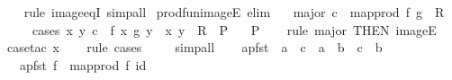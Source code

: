 \begin{isabellebody}
%
\isadelimproof
\ \ %
\endisadelimproof
%
\isatagproof
{}\isamarkupfalse%
\ {\isacharparenleft}{\kern0pt}rule\ image{\isacharunderscore}{\kern0pt}eqI{\isacharparenright}{\kern0pt}\ simp{\isacharunderscore}{\kern0pt}all%
\endisatagproof
{\isafoldproof}%
%
\isadelimproof
\isanewline
%
\endisadelimproof
\isanewline
{}\isamarkupfalse%
\ prod{\isacharunderscore}{\kern0pt}fun{\isacharunderscore}{\kern0pt}imageE\ {\isacharbrackleft}{\kern0pt}elim{\isacharbang}{\kern0pt}{\isacharbrackright}{\kern0pt}{\isacharcolon}{\kern0pt}\isanewline
\ \ \ major{\isacharcolon}{\kern0pt}\ {\isachardoublequoteopen}c\ {\isasymin}\ map{\isacharunderscore}{\kern0pt}prod\ f\ g\ {\isacharbackquote}{\kern0pt}\ R{\isachardoublequoteclose}\isanewline
\ \ \ \ \ cases{\isacharcolon}{\kern0pt}\ {\isachardoublequoteopen}{\isasymAnd}x\ y{\isachardot}{\kern0pt}\ c\ {\isacharequal}{\kern0pt}\ {\isacharparenleft}{\kern0pt}f\ x{\isacharcomma}{\kern0pt}\ g\ y{\isacharparenright}{\kern0pt}\ {\isasymLongrightarrow}\ {\isacharparenleft}{\kern0pt}x{\isacharcomma}{\kern0pt}\ y{\isacharparenright}{\kern0pt}\ {\isasymin}\ R\ {\isasymLongrightarrow}\ P{\isachardoublequoteclose}\isanewline
\ \ \ P\isanewline
%
\isadelimproof
\ \ %
\endisadelimproof
%
\isatagproof
{}\isamarkupfalse%
\ {\isacharparenleft}{\kern0pt}rule\ major\ {\isacharbrackleft}{\kern0pt}THEN\ imageE{\isacharbrackright}{\kern0pt}{\isacharparenright}{\kern0pt}\isanewline
\ \ \isamarkupfalse%
\ {\isacharparenleft}{\kern0pt}case{\isacharunderscore}{\kern0pt}tac\ x{\isacharparenright}{\kern0pt}\isanewline
\ \ \isamarkupfalse%
\ {\isacharparenleft}{\kern0pt}rule\ cases{\isacharparenright}{\kern0pt}\isanewline
\ \ \ \isamarkupfalse%
\ simp{\isacharunderscore}{\kern0pt}all\isanewline
\ \ \isamarkupfalse%
%
\endisatagproof
{\isafoldproof}%
%
\isadelimproof
\isanewline
%
\endisadelimproof
\isanewline
{}\isamarkupfalse%
\ apfst\ {\isacharcolon}{\kern0pt}{\isacharcolon}{\kern0pt}\ {\isachardoublequoteopen}{\isacharparenleft}{\kern0pt}{\isacharprime}{\kern0pt}a\ {\isasymRightarrow}\ {\isacharprime}{\kern0pt}c{\isacharparenright}{\kern0pt}\ {\isasymRightarrow}\ {\isacharprime}{\kern0pt}a\ {\isasymtimes}\ {\isacharprime}{\kern0pt}b\ {\isasymRightarrow}\ {\isacharprime}{\kern0pt}c\ {\isasymtimes}\ {\isacharprime}{\kern0pt}b{\isachardoublequoteclose}\isanewline
\ \ \ {\isachardoublequoteopen}apfst\ f\ {\isacharequal}{\kern0pt}\ map{\isacharunderscore}{\kern0pt}prod\ f\ id{\isachardoublequoteclose}\isanewline

\end{isabellebody}
